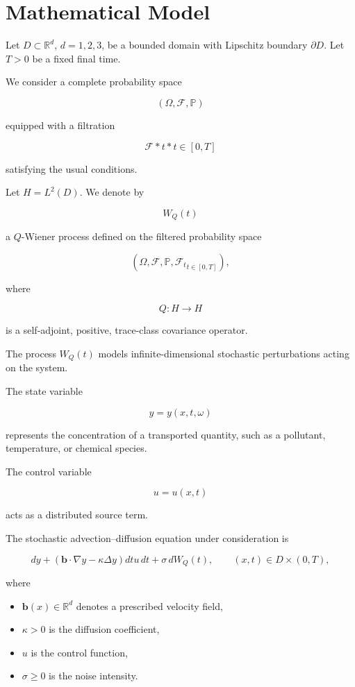 \section{Mathematical Model}

Let \(D\subset\mathbb{R}^d\), \(d=1,2,3\), be a bounded domain with Lipschitz boundary \(\partial D\). 
Let \(T>0\) be a fixed final time.

We consider a complete probability space

\[
(\Omega,\mathcal{F},\mathbb{P})
\]

equipped with a filtration

\[
{\mathcal{F}*t}*{t\in[0,T]}
\]

satisfying the usual conditions.

Let \(H=L^2(D)\). We denote by

\[
W_Q(t)
\]

a \(Q\)-Wiener process defined on the filtered probability space

\[
(\Omega,\mathcal F,\mathbb P,
{\mathcal F_t}_{t\in[0,T]}),
\]

where

\[
Q:H\rightarrow H
\]

is a self-adjoint, positive, trace-class covariance operator.

The process \(W_Q(t)\) models infinite-dimensional stochastic perturbations acting on the system.


The state variable

\[
y=y(x,t,\omega)
\]

represents the concentration of a transported quantity, such as a pollutant, temperature, or chemical species.

The control variable

\[
u=u(x,t)
\]

acts as a distributed source term.

The stochastic advection--diffusion equation under consideration is

\[
dy
+
\left(
\mathbf{b}\cdot\nabla y
-
\kappa \Delta y
\right)dt
u\,dt
+
\sigma\,dW_Q(t),
\qquad
(x,t)\in D\times(0,T),
\]

where

\begin{itemize}
\item \(\mathbf{b}(x)\in\mathbb{R}^d\) denotes a prescribed velocity field,
\item \(\kappa>0\) is the diffusion coefficient,
\item \(u\) is the control function,
\item \(\sigma\ge 0\) is the noise intensity.
\end{itemize}

